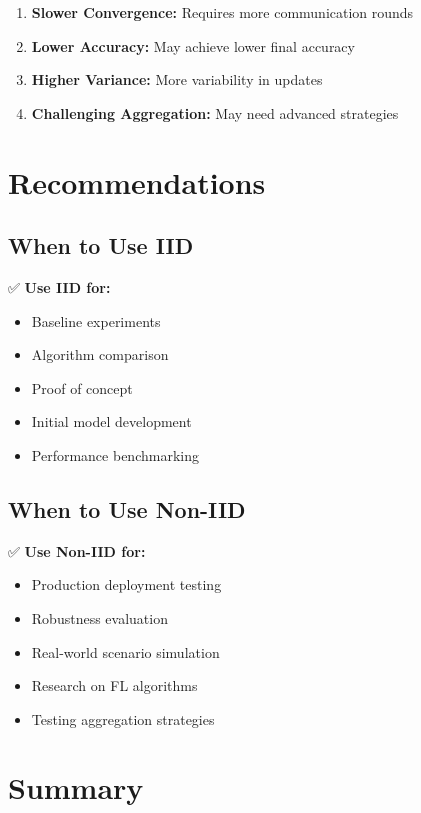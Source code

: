 \documentclass[12pt,a4paper]{article}
\begin{document}
\begin{enumerate}
    \item \textbf{Slower Convergence:} Requires more communication rounds
    \item \textbf{Lower Accuracy:} May achieve lower final accuracy
    \item \textbf{Higher Variance:} More variability in updates
    \item \textbf{Challenging Aggregation:} May need advanced strategies
\end{enumerate}

\section{Recommendations}

\subsection{When to Use IID}

✅ \textbf{Use IID for:}
\begin{itemize}
    \item Baseline experiments
    \item Algorithm comparison
    \item Proof of concept
    \item Initial model development
    \item Performance benchmarking
\end{itemize}

\subsection{When to Use Non-IID}

✅ \textbf{Use Non-IID for:}
\begin{itemize}
    \item Production deployment testing
    \item Robustness evaluation
    \item Real-world scenario simulation
    \item Research on FL algorithms
    \item Testing aggregation strategies
\end{itemize}

\section{Summary}
\end{document}
